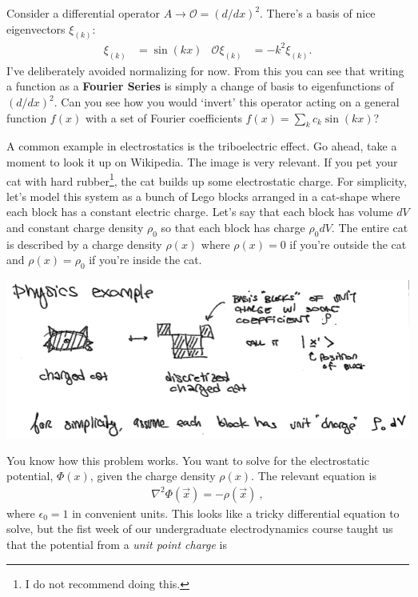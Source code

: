 \begin{example}
Consider a differential operator $A\to \mathcal O = (d/dx)^2$. There's a basis of nice eigenvectors $\xi_{(k)}$:
 \begin{align}
   \xi_{(k)} &= \sin (kx)
   &
   \mathcal O \xi_{(k)} &= -k^2 \xi_{(k)}. 
 \end{align}
 I've deliberately avoided normalizing for now. From this you can see that writing a function as a \textbf{Fourier Series} is simply a change of basis to eigenfunctions of $(d/dx)^2$. Can you see how you would `invert' this operator acting on a general function $f(x)$ with a set of Fourier coefficients $f(x) = \sum_k c_k\sin(kx)$?
\end{example} 


\begin{example}\label{eq:charged:cat}
A common example in electrostatics is the triboelectric effect. Go ahead, take a moment to look it up on Wikipedia. The image is very relevant. If you pet your cat with hard rubber\footnote{I do not recommend doing this.}, the cat builds up some electrostatic charge. For simplicity, let's model this system as a bunch of Lego blocks arranged in a cat-shape where each block has a constant electric charge. Let's say that each block has volume $dV$ and constant charge density $\rho_0$ so that each block has charge $\rho_0 dV$. The entire cat is described by a charge density $\rho(x)$ where $\rho(x)=0$ if you're outside the cat and $\rho(x)=\rho_0$ if you're inside the cat. 
\begin{center}
\includegraphics[width=.8\textwidth]{figures/lec06_cat.png}
\end{center}
You know how this problem works. You want to solve for the electrostatic potential, $\Phi(x)$, given the charge density $\rho(x)$. The relevant equation is
\begin{align}
  \nabla^2 \Phi(\vec{x}) = -\rho(\vec{x})\ ,
\end{align}
where $\epsilon_0=1$ in convenient units. This looks like a tricky differential equation to solve, but the fist week of our undergraduate electrodynamics course taught us that the potential from a \emph{unit point charge} is

\end{example}
